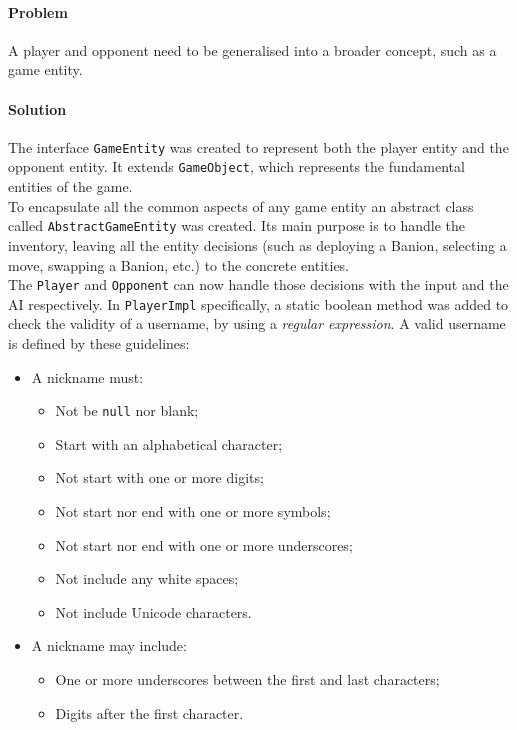 \documentclass[12pt, a4paper]{report}
\theoremstyle{definition}
\begin{document}
    \paragraph{Problem}
    A player and opponent need to be generalised into a broader concept, such as a game entity.
    \paragraph{Solution}
    The interface \verb|GameEntity| was created to represent both the player entity and the opponent entity.
    It extends \verb|GameObject|, which represents the fundamental entities of the game.\\
    To encapsulate all the common aspects of any game entity an abstract class called \verb|AbstractGameEntity| was created. Its main purpose is to handle the inventory, leaving all the
    entity decisions (such as deploying a Banion, selecting a move, swapping a Banion, etc.) to the concrete entities.\\
    The \verb|Player| and \verb|Opponent| can now handle those decisions with the input and the AI respectively.
    In \verb|PlayerImpl| specifically, a static boolean method was added to check the validity of a username, by using a \textit{regular expression}.
    A valid username is defined by these guidelines:

    \begin{itemize}
        \item A nickname must:
        \begin{itemize}
            \item Not be \verb|null| nor blank;
            \item Start with an alphabetical character;
            \item Not start with one or more digits;
            \item Not start nor end with one or more symbols;
            \item Not start nor end with one or more underscores;
            \item Not include any white spaces;
            \item Not include Unicode characters.
        \end{itemize}
        \item A nickname may include:
        \begin{itemize}
            \item One or more underscores between the first and last characters;
            \item Digits after the first character.
        \end{itemize}
    \end{itemize}
\end{document}

